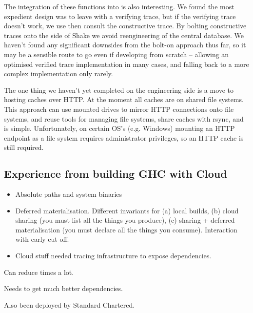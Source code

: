 The integration of these functions into \Shake is also interesting. We found the most expedient design was to leave \Shake with a verifying trace, but if the verifying trace doesn't work, we use then consult the constructive trace. By bolting constructive traces onto the side of Shake we avoid reengineering of the central database. We haven't found any significant downsides from the bolt-on approach thus far, so it may be a sensible route to go even if developing from scratch -- allowing an optimised verified trace implementation in many cases, and falling back to a more complex implementation only rarely.

The one thing we haven't yet completed on the engineering side is a move to hosting caches over HTTP. At the moment all caches are on shared file systems. This approach can use mounted drives to mirror HTTP connections onto file systems, and reuse tools for managing file systems, share caches with rsync, and is simple. Unfortunately, on certain OS's (e.g. Windows) mounting an HTTP endpoint as a file system requires administrator privileges, so an HTTP cache is still required.

\subsection{Experience from building GHC with Cloud \Shake}

\begin{itemize}
\item Absolute paths and system binaries
\item Deferred materialisation. Different invariants for (a) local builds, (b) cloud sharing (you must list all the things you produce), (c) sharing + deferred materialisation (you must declare all the things you consume). Interaction with early cut-off.
\item  Cloud stuff needed tracing infrastructure to expose dependencies.
\end{itemize}


Can reduce times a lot.

Needs to get much better dependencies.

Also been deployed by Standard Chartered.
